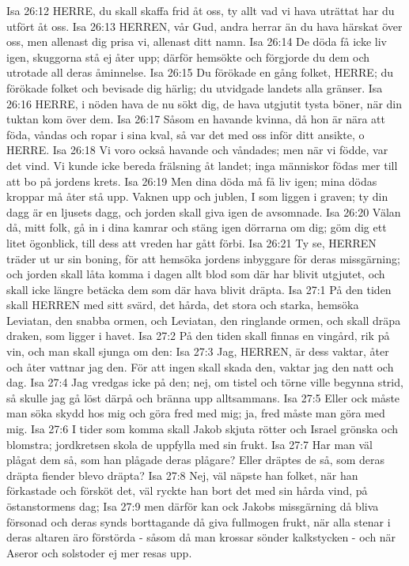 Isa 26:12  HERRE, du skall skaffa frid åt oss, ty allt vad vi hava uträttat har du utfört åt oss.
Isa 26:13  HERREN, vår Gud, andra herrar än du hava härskat över oss, men allenast dig prisa vi, allenast ditt namn.
Isa 26:14  De döda få icke liv igen, skuggorna stå ej åter upp; därför hemsökte och förgjorde du dem och utrotade all deras åminnelse.
Isa 26:15  Du förökade en gång folket, HERRE; du förökade folket och bevisade dig härlig; du utvidgade landets alla gränser.
Isa 26:16  HERRE, i nöden hava de nu sökt dig, de hava utgjutit tysta böner, när din tuktan kom över dem.
Isa 26:17  Såsom en havande kvinna, då hon är nära att föda, våndas och ropar i sina kval, så var det med oss inför ditt ansikte, o HERRE.
Isa 26:18  Vi voro också havande och våndades; men när vi födde, var det vind. Vi kunde icke bereda frälsning åt landet; inga människor födas mer till att bo på jordens krets.
Isa 26:19  Men dina döda må få liv igen; mina dödas kroppar må åter stå upp. Vaknen upp och jublen, I som liggen i graven; ty din dagg är en ljusets dagg, och jorden skall giva igen de avsomnade.
Isa 26:20  Välan då, mitt folk, gå in i dina kamrar och stäng igen dörrarna om dig; göm dig ett litet ögonblick, till dess att vreden har gått förbi.
Isa 26:21  Ty se, HERREN träder ut ur sin boning, för att hemsöka jordens inbyggare för deras missgärning; och jorden skall låta komma i dagen allt blod som där har blivit utgjutet, och skall icke längre betäcka dem som där hava blivit dräpta.
Isa 27:1  På den tiden skall HERREN med sitt svärd, det hårda, det stora och starka, hemsöka Leviatan, den snabba ormen, och Leviatan, den ringlande ormen, och skall dräpa draken, som ligger i havet.
Isa 27:2  På den tiden skall finnas en vingård, rik på vin, och man skall sjunga om den:
Isa 27:3  Jag, HERREN, är dess vaktar, åter och åter vattnar jag den. För att ingen skall skada den, vaktar jag den natt och dag.
Isa 27:4  Jag vredgas icke på den; nej, om tistel och törne ville begynna strid, så skulle jag gå löst därpå och bränna upp alltsammans.
Isa 27:5  Eller ock måste man söka skydd hos mig och göra fred med mig; ja, fred måste man göra med mig.
Isa 27:6  I tider som komma skall Jakob skjuta rötter och Israel grönska och blomstra; jordkretsen skola de uppfylla med sin frukt.
Isa 27:7  Har man väl plågat dem så, som han plågade deras plågare? Eller dräptes de så, som deras dräpta fiender blevo dräpta?
Isa 27:8  Nej, väl näpste han folket, när han förkastade och försköt det, väl ryckte han bort det med sin hårda vind, på östanstormens dag;
Isa 27:9  men därför kan ock Jakobs missgärning då bliva försonad och deras synds borttagande då giva fullmogen frukt, när alla stenar i deras altaren äro förstörda - såsom då man krossar sönder kalkstycken - och när Aseror och solstoder ej mer resas upp.
